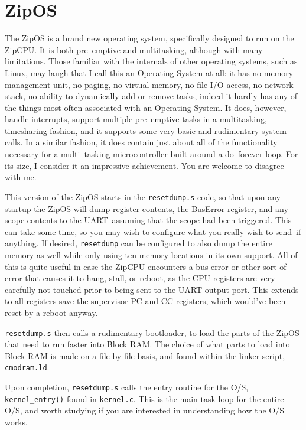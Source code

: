\documentclass{gqtekspec}
\begin{document}
\section{ZipOS}
The ZipOS is a brand new operating system, specifically designed to run on the
ZipCPU.  It is both pre--emptive and multitasking, although with many
limitations.  Those familiar with the internals of other operating systems, such
as Linux, may laugh that I call this an Operating System at all: it has no
memory management unit, no paging, no virtual memory, no file I/O access, no
network stack, no ability to dynamically add or remove tasks, indeed it hardly
has any of the things most often associated with an Operating System.  It does,
however, handle interrupts, support multiple pre--emptive tasks in a
multitasking, timesharing fashion, and it supports some very basic and
rudimentary system calls.  In a similar fashion, it does contain just about all
of the functionality necessary for a multi--tasking microcontroller built
around a do--forever loop.  For its size, I consider it an impressive
achievement.  You are welcome to disagree with me.

This version of the ZipOS starts in the {\tt resetdump.s} code, so that upon
any startup the ZipOS will dump register contents, the BusError register, and
any scope contents to the UART--assuming that the scope had been triggered.
This can take some time, so you may wish to configure what you really wish to
send--if anything.  If desired, {\tt resetdump} can be configured to also
dump the entire memory as well while only using ten memory locations in its own
support.  All of this is quite useful in case the
ZipCPU encounters a bus error or other sort of error that causes it to hang,
stall, or reboot, as the CPU registers are very carefully not touched prior to
being sent to the UART output port.  This extends to all registers save the
supervisor PC and CC registers, which would've been reset by a reboot anyway.

{\tt resetdump.s} then calls a rudimentary bootloader, to load the parts of
the ZipOS that need to run faster into Block RAM.  The choice of what parts
to load into Block RAM is made on a file by file basis, and found within
the linker script, {\tt cmodram.ld}.

Upon completion, {\tt resetdump.s} calls the entry routine for the O/S,
{\tt kernel\_entry()} found in {\tt kernel.c}.  This is the main task loop for
the entire O/S, and worth studying if you are interested in understanding how
the O/S works.
\end{document}
